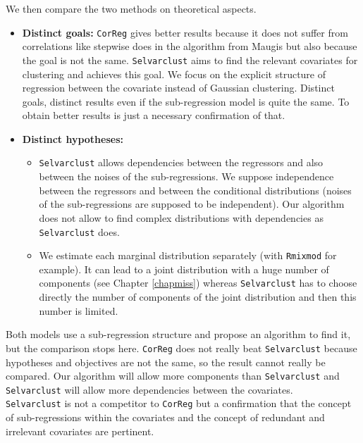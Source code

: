 \documentclass[12pt,a4paper]{report}
\begin{document}
	 
We then compare the two methods on theoretical aspects.
\begin{itemize}
	\item \textbf{Distinct goals:} {\tt CorReg} gives better results because it does not suffer from correlations like stepwise does in the algorithm from Maugis but also because the goal is not the same. {\tt Selvarclust} aims to find the relevant covariates for clustering and achieves this goal. We focus on the explicit structure of regression between the covariate instead of Gaussian clustering. Distinct goals, distinct results even if the sub-regression model is quite the same. To obtain better results is just a necessary confirmation of that.
	\item \textbf{Distinct hypotheses:}  
	\begin{itemize}
		\item {\tt Selvarclust} allows dependencies between the regressors and also between the noises of the sub-regressions. We suppose independence between the regressors and between the conditional distributions (noises of the sub-regressions are supposed to be independent). %
		 Our algorithm does not allow to find complex distributions with dependencies as {\tt Selvarclust} does. 
		\item We estimate each marginal distribution separately (with {\tt Rmixmod} for example). It can lead to a joint distribution with a huge number of components (see Chapter \ref{chapmiss}) whereas {\tt Selvarclust} has to choose directly the number of components of the joint distribution and then this number is limited.
	\end{itemize} 
\end{itemize}	 	 
	  Both models use a sub-regression structure and propose an algorithm to find it, but the comparison stops here. {\tt CorReg} does not really beat {\tt Selvarclust} because hypotheses and objectives are not the same,  so the result cannot really be compared. Our algorithm will allow more components than {\tt Selvarclust} and {\tt Selvarclust} will allow more dependencies between the covariates.\\
	  {\tt Selvarclust} is not a competitor to {\tt CorReg} but a confirmation that the concept of sub-regressions within the covariates and the concept of redundant and irrelevant covariates are pertinent.
   
\end{document}
